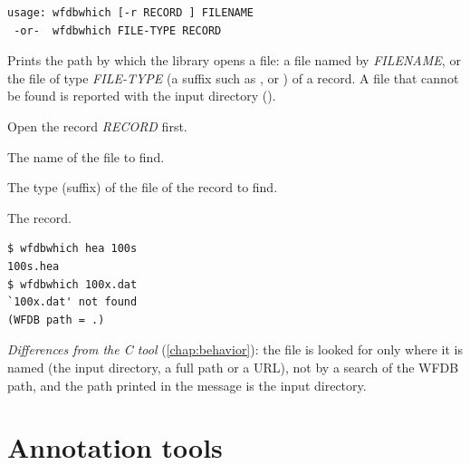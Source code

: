 \begin{lstlisting}[style=signature,language={}]
usage: wfdbwhich [-r RECORD ] FILENAME
 -or-  wfdbwhich FILE-TYPE RECORD
\end{lstlisting}
Prints the path by which the library opens a file: a file named by \textit{FILENAME}, or
the file of type \textit{FILE-TYPE} (a suffix such as ,  or )
of a record. A file that cannot be found is reported with the input directory
().
\begin{params}
\item[-r] Open the record \textit{RECORD} first.
\item[FILENAME] The name of the file to find.
\item[FILE-TYPE] The type (suffix) of the file of the record to find.
\item[RECORD] The record.
\end{params}
\begin{lstlisting}[style=text]
$ wfdbwhich hea 100s
100s.hea
$ wfdbwhich 100x.dat
`100x.dat' not found
(WFDB path = .)
\end{lstlisting}
\textit{Differences from the C tool} (\cref{chap:behavior}): the file is looked for only
where it is named (the input directory, a full path or a URL), not by a search of the WFDB
path, and the path printed in the message is the input directory.

\section{Annotation tools}
\label{sec:tools-annotation}

